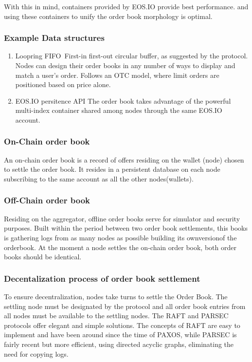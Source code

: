 \documentclass[]{article}
\begin{document}
{With this in mind, containers provided by EOS.IO provide best performance.\cite{25} and
using these containers to unify the order book morphology is optimal.


\subsubsection{Example Data structures}
\begin{enumerate}
\item Loopring FIFO\
	First-in first-out circular buffer, as suggested by the protocol. 
	Nodes can design their order books in any number of ways to display and match a user's order. 
	Follows an OTC model, where limit orders are positioned based on price alone.
	\cite{7}  
\item EOS.IO persitence API
	The order book takes advantage of the powerful multi-index container shared among nodes through the same EOS.IO account.
\end{enumerate}


\subsubsection{On-Chain order book}
An on-chain order book is a record of offers residing on the wallet (node) chosen to settle the order book. It resides in a persistent database on each node subscribing to the same account as all the other nodes(wallets).

\subsubsection{Off-Chain order book}
Residing on the aggregator, offline order books serve for simulator and security purposes.
Built within the period between two order book settlements, this books is gathering logs from as many nodes as possible building its ownversionof the orderbook. At the moment a node settles the on-chain order book, both order books should be identical.
 
 
 
\subsubsection{Decentalization process of order book settlement}
To ensure decentralization, nodes take turns to settle the Order Book. 
The settling node must be designated by the protocol and all order book entries from all nodes must be available to the settling nodes. 
The RAFT\cite{18} and PARSEC\cite{23} protocols offer elegant and simple solutions. 
The concepts of RAFT are easy to implement and have been around since the time of PAXOS\cite{24}, 
while PARSEC is fairly recent but more efficient, using directed acyclic graphs, eliminating the need for copying logs.

}
\end{document}
